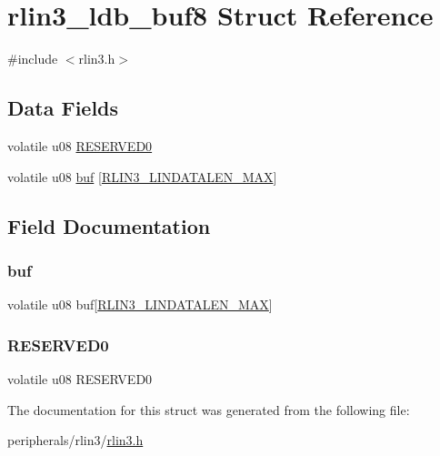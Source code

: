 \hypertarget{structrlin3__ldb__buf8}{}\section{rlin3\+\_\+ldb\+\_\+buf8 Struct Reference}
\label{structrlin3__ldb__buf8}


{\ttfamily \#include $<$rlin3.\+h$>$}

\subsection*{Data Fields}
\begin{DoxyCompactItemize}
\item 
volatile u08 \mbox{\hyperlink{structrlin3__ldb__buf8_a59c0b30ccfb89f1b34e9682741859abd}{R\+E\+S\+E\+R\+V\+E\+D0}}
\item 
volatile u08 \mbox{\hyperlink{structrlin3__ldb__buf8_a3e27eaf01eda94d8bf8d14c810f626cc}{buf}} \mbox{[}\mbox{\hyperlink{rlin3_8h_a637a014dce5f1d6c8e5c72a9df39e88f}{R\+L\+I\+N3\+\_\+\+L\+I\+N\+D\+A\+T\+A\+L\+E\+N\+\_\+\+M\+AX}}\mbox{]}
\end{DoxyCompactItemize}


\subsection{Field Documentation}
\mbox{\label{structrlin3__ldb__buf8_a3e27eaf01eda94d8bf8d14c810f626cc}} 
\subsubsection{\texorpdfstring{buf}{buf}}
{\footnotesize\ttfamily volatile u08 buf\mbox{[}\mbox{\hyperlink{rlin3_8h_a637a014dce5f1d6c8e5c72a9df39e88f}{R\+L\+I\+N3\+\_\+\+L\+I\+N\+D\+A\+T\+A\+L\+E\+N\+\_\+\+M\+AX}}\mbox{]}}

\mbox{\label{structrlin3__ldb__buf8_a59c0b30ccfb89f1b34e9682741859abd}} 
\subsubsection{\texorpdfstring{R\+E\+S\+E\+R\+V\+E\+D0}{RESERVED0}}
{\footnotesize\ttfamily volatile u08 R\+E\+S\+E\+R\+V\+E\+D0}



The documentation for this struct was generated from the following file\+:\begin{DoxyCompactItemize}
\item 
peripherals/rlin3/\mbox{\hyperlink{rlin3_8h}{rlin3.\+h}}\end{DoxyCompactItemize}
